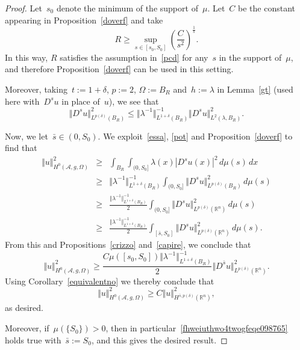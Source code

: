 \documentclass[11pt,hyp,]{nyjm}
\numberwithin{equation}{section}
\newcommand{\R}{\mathbb{R}}
\theoremstyle{remark}
\renewcommand{\le}{\leqslant}
\renewcommand{\geq}{\geqslant}
\renewcommand{\ge}{\geqslant}
\begin{document}
\begin{proof} Let~$s_0$ denote the minimum of the support of~$\mu$.
Let~$C$ be the constant appearing in Proposition~\ref{doverf} and take
$$ R\ge \sup_{s\in[s_0,S_0]}\left(\frac{C}{s^2}\right)^{\frac1s}.$$
In this way, $R$ satisfies the assumption
in~\eqref{pcd} for any~$s$ in the support of~$\mu$, and therefore Proposition~\ref{doverf} can be used in this setting. 

Moreover, taking~$t:= 1+\delta$, $p:=2$, $\Omega:=B_R$ and~$h:=\lambda$ 
in Lemma~\ref{gt} (used here with~$D^s u $ in place of~$u$), we see that
\begin{equation}\label{pot}
 \Vert D^s u \Vert^2_{L^{p(\delta)}(B_R)}\le \Vert \lambda^{-1}\Vert^{-1}_{L^{1+\delta}(B_R)} \Vert D^s u \Vert_{L^2(\lambda, B_R)}^2.
\end{equation}

Now, we let~$\bar{s} \in (0,S_0)$. We exploit~\eqref{essa}, \eqref{pot}
and Proposition~\ref{doverf} to find that
\begin{eqnarray*}
\Vert u \Vert^2_{H^{0}(\mathcal{A}, g, \Omega)}&\ge&
\int_{B_R}\int_{(0,S_0]} \lambda(x) |D^su(x)|^2 \, d\mu(s) \, dx \\&
\geq& \Vert \lambda^{-1} \Vert_{L^{1+\delta}(B_R)}^{-1} \int_{(0,S_0]} \Vert D^s u \Vert^2_{L^{p(\delta)}(B_R)} \, d\mu (s)\\
&   \ge &
\frac{\Vert \lambda^{-1} \Vert_{L^{1+\delta}(B_R)}^{-1}}2 \int_{(0,S_0]} \Vert D^s u \Vert^2_{L^{p(\delta)}(\R^n)} \, d\mu (s)
 \\&\ge&
\frac{\Vert \lambda^{-1} \Vert_{L^{1+\delta}(B_R)}^{-1}}2 \int_{[\bar s,S_0]} \Vert D^s u \Vert^2_{L^{p(\delta)}(\R^n)} \, d\mu (s)
.\end{eqnarray*}
{F}rom this and Propositions~\ref{crizzo} and~\ref{capire}, we conclude that
\begin{equation}\label{fhweiuthwo4twogfeqe098765}
\Vert u \Vert^2_{H^{0}(\mathcal{A}, g, \Omega)}\ge \frac{C\mu([s_0,S_0])\Vert \lambda^{-1} \Vert_{L^{1+\delta}(B_R)}^{-1}}2
\Vert D^{\bar{s}} u \Vert^2_{L^{p(\delta)}(\R^n)}.
\end{equation} 
Using Corollary~\ref{equivalentno} we thereby conclude that
$$ 
\Vert u \Vert^2_{H^{0}(\mathcal{A}, g, \Omega)}
  \geq C \Vert u \Vert^2_{H^{\bar{s}, p(\delta)}(\R^n)},
$$ as desired.

Moreover,  if~$\mu\left(\{S_0\}\right)>0$, then in particular~\eqref{fhweiuthwo4twogfeqe098765} holds true with~$\bar s:=S_0$, and
this gives the desired result.
\end{proof}
\end{document}

